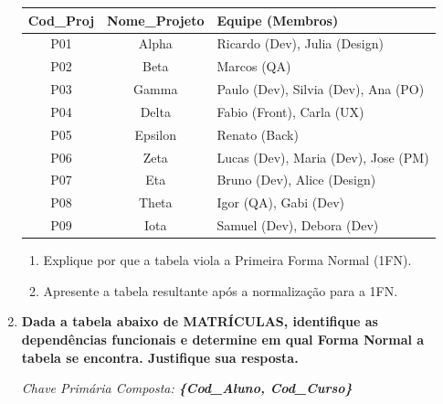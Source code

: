 \documentclass[12pt,a4paper]{article}
\newcommand{\resposta}[1]{
\noindent
\framebox[\textwidth]{
\begin{minipage}{0.98\textwidth}
\vspace{#1}
\end{minipage}
}
}
\begin{document}
\begin{enumerate}
    \begin{center}
        \begin{tabularx}{\textwidth}{|c|c|X|}
            \hline
            \cellcolor{gray!20}\textbf{Cod\_Proj} & \cellcolor{gray!20}\textbf{Nome\_Projeto} & \cellcolor{gray!20}\textbf{Equipe (Membros)} \\ \hline
            P01 & Alpha & Ricardo (Dev), Julia (Design) \\ \hline
            P02 & Beta & Marcos (QA) \\ \hline
            P03 & Gamma & Paulo (Dev), Silvia (Dev), Ana (PO) \\ \hline
            P04 & Delta & Fabio (Front), Carla (UX) \\ \hline
            P05 & Epsilon & Renato (Back) \\ \hline
            P06 & Zeta & Lucas (Dev), Maria (Dev), Jose (PM) \\ \hline
            P07 & Eta & Bruno (Dev), Alice (Design) \\ \hline
            P08 & Theta & Igor (QA), Gabi (Dev) \\ \hline
            P09 & Iota & Samuel (Dev), Debora (Dev) \\ \hline
        \end{tabularx}
    \end{center}
    \begin{enumerate}[label=(\Alph*)]
        \item Explique por que a tabela viola a Primeira Forma Normal (1FN).\\
        \resposta{2cm}
        \item Apresente a tabela resultante após a normalização para a 1FN.\\
        \resposta{5cm}
    \end{enumerate}

    \item \textbf{Dada a tabela abaixo de MATRÍCULAS, identifique as dependências funcionais e determine em qual Forma Normal a tabela se encontra. Justifique sua resposta.}
    
    \textit{Chave Primária Composta: \textbf{\{Cod\_Aluno, Cod\_Curso\}}}
    

\end{enumerate}
\end{document}

